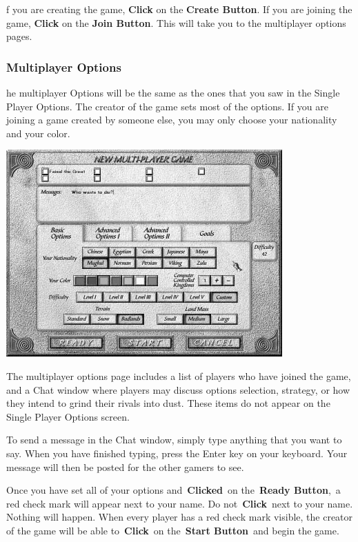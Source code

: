 f you are creating the game, \textbf{Click} on the \textbf{Create Button}. If you are joining the game, \textbf{Click} on the \textbf{Join Button}. This will take you to the multiplayer options pages.

\subsubsection{Multiplayer Options}

he multiplayer Options will be the same as the ones that you saw in the Single Player Options. The creator of the game sets most of the options. If you are joining a game created by someone else, you may only choose your nationality and your color.


\begin{center}
	\includegraphics[width=0.9\linewidth]{Imultiplayer3}
\end{center}

The multiplayer options page includes a list of players who have joined the game, and a Chat window where players may discuss options selection, strategy, or how they intend to grind their rivals into dust. These items do not appear on the Single Player Options screen.

To send a message in the Chat window, simply type anything that you want to say. When you have finished typing, press the Enter key on your keyboard. Your message will then be posted for the other gamers to see.

Once you have set all of your options and \textbf{Clicked} on the \textbf{Ready Button}, a red check mark will appear next to your name. Do not \textbf{Click} next to your name. Nothing will happen. When every player has a red check mark visible, the creator of the game will be able to \textbf{Click} on the \textbf{Start Button} and begin the game.

